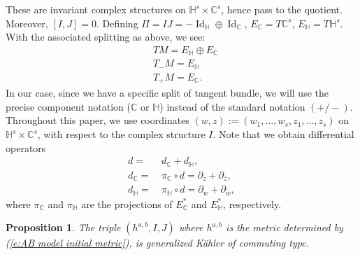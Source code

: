 \documentclass[12pt]{amsart}
\numberwithin{equation}{section}
\newtheorem{prop}{Proposition}
\numberwithin{prop}{section}
\theoremstyle{definition}
\renewcommand{\bar}[1]{\overline{#1}}
\begin{document}
    These are invariant complex structures on $\mathbb{H}^s\times\mathbb{C}^s$, hence pass to the quotient.  Moreover, $[I,J]=0$.  Defining $\Pi=IJ = -\operatorname{Id}_\mathbb{H}\oplus\operatorname{Id}_\mathbb{C}$, $E_\mathbb{C} = T\mathbb{C}^s$, $E_\mathbb{H} = T\mathbb{H}^s$. With the associated splitting as above, we see:
    \begin{align*}
        &TM = E_\mathbb{H}\oplus E_\mathbb{C}\\
        &T_-M = E_\mathbb{H}\\
        &T_+M = E_\mathbb{C}.
    \end{align*}
    In our case, since we have a specific split of tangent bundle, we will use the precise component notation ($\mathbb{C}$ or $\mathbb{H}$) instead of the standard notation $(+/-)$. Throughout this paper, we use coordinates $(w,z):=(w_1, \dots, w_s, z_1, \dots, z_s)$ on $\mathbb H^s \times \mathbb C^s$, with respect to the complex structure $I$.
    Note that we obtain differential operators 
    \begin{align*}
    d=&\ d_\mathbb{C}+d_\mathbb{H},\\
d_\mathbb{C}=&\ \pi_{\mathbb{C}} \circ d=\partial_z+\partial_{\bar{z}},\\
    d_\mathbb{H}=&\ \pi_{\mathbb{H}} \circ d =\partial_w+\partial_{\bar{w}},
    \end{align*}
    where $\pi_\mathbb{C}$ and $\pi_\mathbb{H}$ are the projections of $E_\mathbb{C}^*$ and $E_\mathbb{H}^*$, respectively.
    \begin{prop} The triple $(h^{a,b}, I, J)$ where $h^{a,b}$ is the metric determined by (\ref{e:AB model initial metric}), is generalized K\"ahler of commuting type.
    \end{prop}
\end{document}
